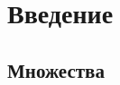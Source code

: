 
\chapter{Введение}

\section{Множества}

\begin{definition}
  
\end{definition}

\begin{definition}
  
\end{definition}
